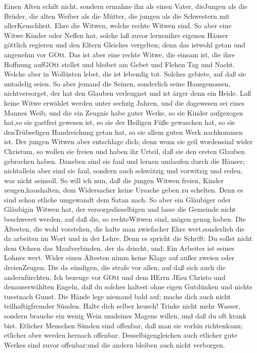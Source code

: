  Einen Alten schilt nicht, sondern ermahne ihn als einen
Vater, dieJungen als die Brüder,  die alten Weiber als die
Mütter, die jungen als die Schwestern mit allerKeuschheit. 
Ehre die Witwen, welche rechte Witwen sind.  So aber eine
Witwe Kinder oder Neffen hat, solche laß zuvor lernenihre eigenen Häuser
göttlich regieren und den Eltern Gleiches vergelten; denn das istwohl
getan und angenehm vor GOtt.  Das ist aber eine rechte
Witwe, die einsam ist, die ihre Hoffnung aufGOtt stellet und bleibet am
Gebet und Flehen Tag und Nacht.  Welche aber in Wollüsten
lebet, die ist lebendig tot.  Solches gebiete, auf daß sie
untadelig seien.  So aber jemand die Seinen, sonderlich
seine Hausgenossen, nichtversorget, der hat den Glauben verleugnet und
ist ärger denn ein Heide.  Laß keine Witwe erwählet werden
unter sechzig Jahren, und die dagewesen sei eines Mannes Weib,
 und die ein Zeugnis habe guter Werke, so sie Kinder
aufgezogen hat,so sie gastfrei gewesen ist, so sie der Heiligen Füße
gewaschen hat, so sie denTrübseligen Handreichung getan hat, so sie
allem guten Werk nachkommen ist.  Der jungen Witwen aber
entschlage dich; denn wenn sie geil wordensind wider Christum, so wollen
sie freien  und haben ihr Urteil, daß sie den ersten
Glauben gebrochen haben.  Daneben sind sie faul und lernen
umlaufen durch die Häuser; nichtallein aber sind sie faul, sondern auch
schwätzig und vorwitzig und reden, was nicht seinsoll.  So
will ich nun, daß die jungen Witwen freien, Kinder zeugen,haushalten,
dem Widersacher keine Ursache geben zu schelten.  Denn es
sind schon etliche umgewandt dem Satan nach.  So aber ein
Gläubiger oder Gläubigin Witwen hat, der versorgedieselbigen und lasse
die Gemeinde nicht beschweret werden, auf daß die, so rechteWitwen sind,
mögen genug haben.  Die Ältesten, die wohl vorstehen, die
halte man zwiefacher Ehre wert,sonderlich die da arbeiten im Wort und in
der Lehre.  Denn es spricht die Schrift: Du sollst nicht
dem Ochsen das Maulverbinden, der da drischt, und: Ein Arbeiter ist
seines Lohnes wert.  Wider einen Ältesten nimm keine Klage
auf außer zweien oder dreienZeugen.  Die da sündigen, die
strafe vor allen, auf daß sich auch die andernfürchten. 
Ich bezeuge vor GOtt und dem HErrn JEsu Christo und denauserwählten
Engeln, daß du solches haltest ohne eigen Gutdünken und nichts tuestnach
Gunst.  Die Hände lege niemand bald auf; mache dich auch
nicht teilhaftigfremder Sünden. Halte dich selber keusch! 
Trinke nicht mehr Wasser, sondern brauche ein wenig Wein umdeines Magens
willen, und daß du oft krank bist.  Etlicher Menschen
Sünden sind offenbar, daß man sie vorhin richtenkann; etlicher aber
werden hernach offenbar.  Desselbigengleichen auch etlicher
gute Werkes sind zuvor offenbar;und die andern bleiben auch nicht
verborgen.

